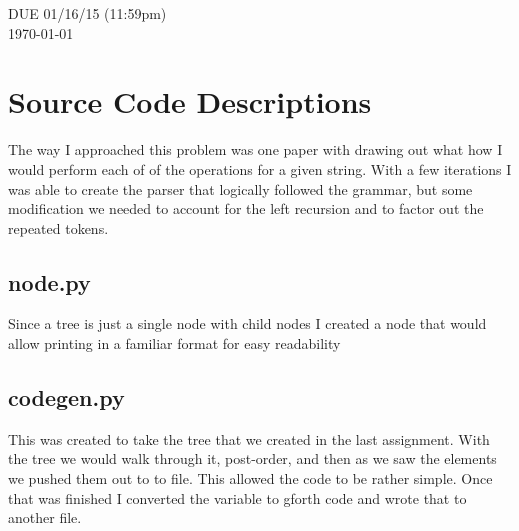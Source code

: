 \documentclass[letterpaper,10pt]{article}
\begin{document}
\begin{titlepage}

DUE 01/16/15 (11:59pm)\\
{\large \today}\\[3cm] %


 

\vfill %

\end{titlepage}

\tableofcontents
\vfill %
\newpage

\section{Source Code Descriptions}
\begin{mdframed}[style=MyFrame]
The way I approached this problem was one paper with drawing out what how I would perform each of of the operations for a given string. With a few iterations I was able to create the parser that logically followed the grammar, but some modification we needed to account for the left recursion and to factor out the repeated tokens. 
\end{mdframed}
\subsection{node.py}
\begin{mdframed}[style=MyFrame]
Since a tree is just a single node with child nodes I created a node that would allow printing in a familiar format for easy readability 
\end{mdframed}
\subsection{codegen.py}
\begin{mdframed}[style=MyFrame]
This was created to take the tree that we created in the last assignment. With the tree we would walk through it, post-order, and then as we saw the elements we pushed them out to to file. This allowed the code to be rather simple. Once that was finished I converted the variable to gforth code and wrote that to another file.
\end{mdframed}
\end{document}
